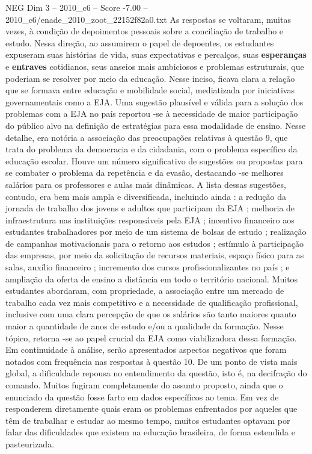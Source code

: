 \begin{textsample}{NEG Dim 3 – 2010\_c6 – Score -7.00 – 2010\_c6/enade\_2010\_zoot\_22152f82a0.txt}
As respostas se voltaram, muitas vezes, à condição de depoimentos pessoais sobre a conciliação de trabalho e estudo.
Nessa direção, ao assumirem o papel de depoentes, os estudantes expuseram suas histórias de vida, suas expectativas e percalços, suas \textbf{esperanças} e \textbf{entraves} cotidianos, seus anseios mais ambiciosos e problemas estruturais, que poderiam se resolver por meio da educação.
Nesse inciso, ficava clara a relação que se formava entre educação e mobilidade social, mediatizada por iniciativas governamentais como a EJA.
Uma sugestão plausível e válida para a solução dos problemas com a EJA no país reportou -se à necessidade de maior participação do público alvo na definição de estratégias para essa modalidade de ensino.
Nesse detalhe, era notória a associação das preocupações relativas à questão 9, que trata do problema da democracia e da cidadania, com o problema específico da educação escolar.
Houve um número significativo de sugestões ou propostas para se combater o problema da repetência e da evasão, destacando -se melhores salários para os professores e aulas mais dinâmicas.
A lista dessas sugestões, contudo, era bem mais ampla e diversificada, incluindo ainda : a redução da jornada de trabalho dos jovens e adultos que participam da EJA ; melhoria de infraestrutura nas instituições responsáveis pela EJA ; incentivo financeiro aos estudantes trabalhadores por meio de um sistema de bolsas de estudo ; realização de campanhas motivacionais para o retorno aos estudos ; estímulo à participação das empresas, por meio da solicitação de recursos materiais, espaço físico para as salas, auxílio financeiro ; incremento dos cursos profissionalizantes no país ; e ampliação da oferta de ensino a distância em todo o território nacional.
Muitos estudantes abordaram, com propriedade, a associação entre um mercado de trabalho cada vez mais competitivo e a necessidade de qualificação profissional, inclusive com uma clara percepção de que os salários são tanto maiores quanto maior a quantidade de anos de estudo e/ou a qualidade da formação.
Nesse tópico, retorna -se ao papel crucial da EJA como viabilizadora dessa formação.
Em continuidade à análise, serão apresentados aspectos negativos que foram notados com frequência nas respostas à questão 10.
De um ponto de vista mais global, a dificuldade repousa no entendimento da questão, isto é, na decifração do comando.
Muitos fugiram completamente do assunto proposto, ainda que o enunciado da questão fosse farto em dados específicos ao tema.
Em vez de responderem diretamente quais eram os problemas enfrentados por aqueles que têm de trabalhar e estudar ao mesmo tempo, muitos estudantes optavam por falar das dificuldades que existem na educação brasileira, de forma estendida e pasteurizada.

\end{textsample}

